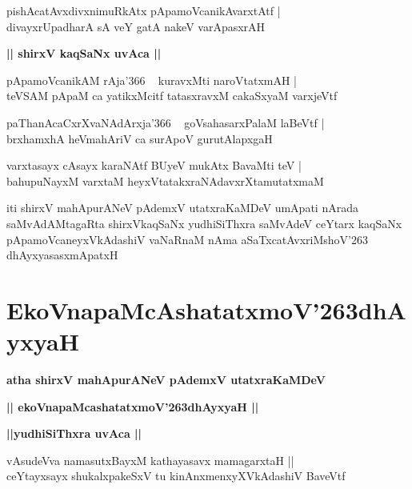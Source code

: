 \documentclass[twoside,12pt,openright]{book}
\def\S{\char'263}
\newcounter{shloka}[chapter]
\def\uvaca#1{\centerline{{\large\textbf{#1}}}}
\begin{document}
\begin{shloka}%
pishAcatAvxdivxnimuRkAtx pApamoVcanikAvarxtAtf |\\
divayxrUpadharA sA veY gatA nakeV varApasxrAH 
\end{shloka}

\uvaca{|| shirxV kaqSaNx uvAca ||}

\begin{shloka}%
pApamoVcanikAM rAja\char'366 ~ kuravxMti naroVtatxmAH |\\
teVSAM pApaM ca yatikxMcitf tatasxravxM cakaSxyaM  varxjeVtf
\end{shloka}

\begin{shloka}%
paThanAcaCxrXvaNAdArxja\char'366 ~ goVsahasarxPalaM laBeVtf |\\
brxhamxhA heVmahAriV ca surApoV gurutAlapxgaH 
\end{shloka}

\begin{shloka}%
varxtasayx cAsayx karaNAtf BUyeV mukAtx BavaMti teV |\\
bahupuNayxM varxtaM heyxVtatakxraNAdavxrXtamutatxmaM 
\end{shloka}

\begin{center}
iti shirxV mahApurANeV pAdemxV utatxraKaMDeV umApati nArada saMvAdAMtagaRta shirxVkaqSaNx 
yudhiSiThxra saMvAdeV ceYtarx kaqSaNx pApamoVcaneyxVkAdashiV vaNaRnaM nAma aSaTxcatAvxriMshoV\S 
dhAyxyasasxmApatxH
\end{center}

\chapter{EkoVnapaMcAshatatxmoV\S dhAyxyaH}

\begin{center}
{\LARGE\bfseries atha shirxV mahApurANeV pAdemxV utatxraKaMDeV}
\end{center}

\begin{center}
{\LARGE\bfseries || ekoVnapaMcashatatxmoV\S dhAyxyaH ||}
\end{center}

\uvaca{||yudhiSiThxra uvAca ||}

\begin{shloka}%
vAsudeVva namasutxBayxM kathayasavx mamagarxtaH ||\\
ceYtayxsayx shukalxpakeSxV tu kinAnxmenxyXVkAdashiV BaveVtf 
\end{shloka}
\end{document}

